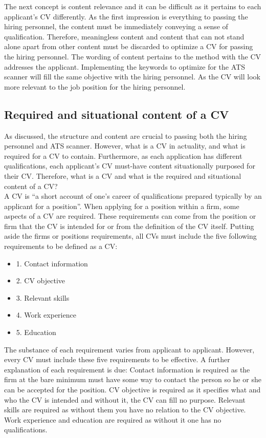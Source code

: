 The next concept is content relevance and it can be difficult as it pertains to each applicant's CV differently.
As the first impression is everything to passing the hiring personnel, the content must be immediately conveying a sense of qualification.
Therefore, meaningless content and content that can not stand alone apart from other content must be discarded to optimize a CV for passing the hiring personnel.
The wording of content pertains to the method with the CV addresses the applicant.
Implementing the keywords to optimize for the ATS scanner will fill the same objective with the hiring personnel.
As the CV will look more relevant to the job position for the hiring personnel.\\

\subsection{Required and situational content of a CV}
As discussed, the structure and content are crucial to passing both the hiring personnel and ATS scanner.
However, what is a CV in actuality, and what is required for a CV to contain.
Furthermore, as each application has different qualifications, each applicant's CV must-have content situationally purposed for their CV.
Therefore, what is a CV and what is the required and situational content of a CV? \\

A CV is “a short account of one’s career of qualifications prepared typically by an applicant for a position”.\cite{Difference_between_resume_and_curriculum_Vitae}
When applying for a position within a firm, some aspects of a CV are required.
These requirements can come from the position or firm that the CV is intended for or from the definition of the CV itself.
Putting aside the firms or positions requirements, all CVs must include the five following requirements to be defined as a CV:
\begin{itemize}
   \item 1. Contact information
   \item 2. CV objective
   \item 3. Relevant skills
   \item 4. Work experience
   \item 5. Education\cite{Write_a_curriculum_Vitae} \\
\end{itemize}
The substance of each requirement varies from applicant to applicant. However, every CV must include these five requirements to be effective.
A further explanation of each requirement is due:
Contact information is required as the firm at the bare minimum must have some way to contact the person so he or she can be accepted for the position.
CV objective is required as it specifies what and who the CV is intended and without it, the CV can fill no purpose.
Relevant skills are required as without them you have no relation to the CV objective.
Work experience and education are required as without it one has no qualifications. \\

